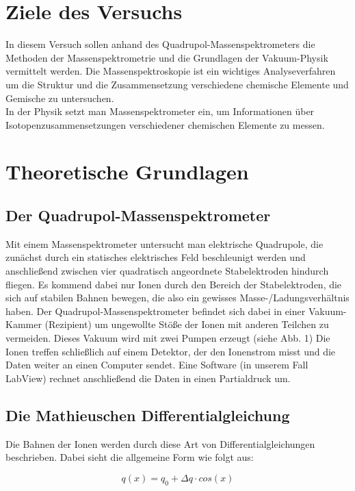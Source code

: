 \section{Ziele des Versuchs}
In diesem Versuch sollen anhand des Quadrupol-Massenspektrometers die Methoden der Massenspektrometrie und die Grundlagen der Vakuum-Physik vermittelt werden. Die Massenspektroskopie ist ein wichtiges Analyseverfahren um die Struktur und die Zusammensetzung verschiedene chemische Elemente und Gemische zu untersuchen.\\
In der Physik setzt man Massenspektrometer ein, um Informationen über Isotopenzusammensetzungen verschiedener chemischen Elemente zu messen.

\section{Theoretische Grundlagen}
\subsection{Der Quadrupol-Massenspektrometer}
Mit einem Massenspektrometer untersucht man elektrische Quadrupole, die zunächst durch ein statisches elektrisches Feld beschleunigt werden und anschließend zwischen vier quadratisch angeordnete Stabelektroden hindurch fliegen. Es kommend dabei nur Ionen durch den Bereich der Stabelektroden, die sich auf stabilen Bahnen bewegen, die also ein gewisses Masse-/Ladungsverhältnis haben. Der Quadrupol-Massenspektrometer befindet sich dabei in einer Vakuum-Kammer (Rezipient) um ungewollte Stöße der Ionen mit anderen Teilchen zu vermeiden. Dieses Vakuum wird mit zwei Pumpen erzeugt (siehe Abb. 1) Die Ionen treffen schließlich auf einem Detektor, der den Ionenstrom misst und die Daten weiter an einen Computer sendet. Eine Software (in unserem Fall LabView) rechnet anschließend die Daten in einen Partialdruck um.


\newpage
\subsection{Die Mathieuschen Differentialgleichung}
Die Bahnen der Ionen werden durch diese Art von Differentialgleichungen beschrieben. Dabei sieht die allgemeine Form wie folgt aus:

\begin{equation}
q(x)=q_0+\Delta q \cdot cos (x)
\end{equation}

